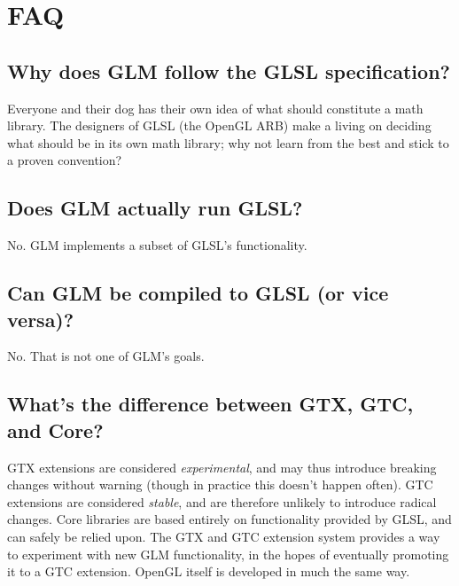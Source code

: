 \documentclass{scrartcl}
\numberwithin{figure}{subsection}
\begin{document}
\newpage{}

\section{FAQ}

\subsection{Why does GLM follow the GLSL specification?}

Everyone and their dog has their own idea of what should constitute a math library.  The designers of GLSL (the OpenGL ARB) make a living on deciding what should be in its own math library; why not learn from the best and stick to a proven convention?

\subsection{Does GLM actually run GLSL?}

No.  GLM implements a subset of GLSL's functionality.

\subsection{Can GLM be compiled to GLSL (or vice versa)?}

No.  That is not one of GLM's goals.

\subsection{What's the difference between GTX, GTC, and Core?}

GTX extensions are considered \emph{experimental}, and may thus introduce breaking changes without warning (though in practice this doesn't happen often).  GTC extensions are considered \emph{stable}, and are therefore unlikely to introduce radical changes.  Core libraries are based entirely on functionality provided by GLSL, and can safely be relied upon.  The GTX and GTC extension system provides a way to experiment with new GLM functionality, in the hopes of eventually promoting it to a GTC extension.  OpenGL itself is developed in much the same way.

%
%
\end{document}
